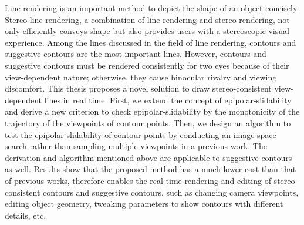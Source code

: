 \begin{englishabstract}

Line rendering is an important method to depict the shape of an object concisely. Stereo line rendering, a combination of line rendering and stereo rendering, not only efficiently conveys shape but also provides users with a stereoscopic visual experience. Among the lines discussed in the field of line rendering, contours and suggestive contours are the most important lines. However, contours and suggestive contours must be rendered consistently for two eyes because of their view-dependent nature; otherwise, they cause binocular rivalry and viewing discomfort. This thesis proposes a novel solution to draw stereo-consistent view-dependent lines in real time. First, we extend the concept of epipolar-slidability and derive a new criterion to check epipolar-slidability by the monotonicity of the trajectory of the viewpoints of contour points. Then, we design an algorithm to test the epipolar-slidability of contour points by conducting an image space search rather than sampling multiple viewpoints in a previous work. The derivation and algorithm mentioned above are applicable to suggestive contours as well. Results show that the proposed method has a much lower cost than that of previous works, therefore enables the real-time rendering and editing of stereo-consistent contours and suggestive contours, such as changing camera viewpoints, editing object geometry, tweaking parameters to show contours with different details, etc.


\end{englishabstract}
